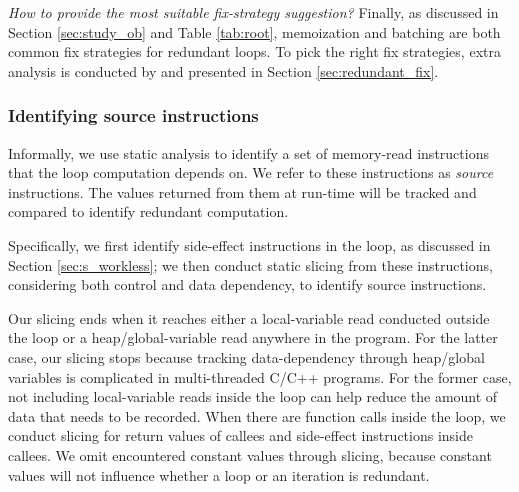 \emph{How to provide the most suitable fix-strategy suggestion?}
Finally, as discussed in Section \ref{sec:study_ob} and Table \ref{tab:root},
memoization and batching are both common fix strategies for redundant loops.
To pick the right fix strategies,
extra analysis is conducted by \Tool and presented in 
Section \ref{sec:redundant_fix}.

\subsubsection{Identifying source instructions}
\label{sec:dependence}

Informally, we use static analysis to identify a set of 
memory-read instructions that the loop computation depends on. We refer
to these instructions as \textit{source} instructions. The values returned
from them at run-time will be tracked and compared to identify
redundant computation.

Specifically, we first identify side-effect instructions in the loop, as 
discussed in Section \ref{sec:s_workless}; we then conduct static slicing 
from these instructions, considering both control and data
dependency, to identify source instructions.

Our slicing ends when it reaches either a local-variable read conducted
outside the loop or a heap/global-variable read anywhere in the program.
For the latter case, our slicing stops because tracking data-dependency
through heap/global variables is complicated in multi-threaded C/C++
programs. For the former case, 
not including local-variable reads inside the loop can help reduce the
amount of data that needs to be recorded. 
When there are function calls inside the loop,  
we conduct slicing for return values of callees and side-effect instructions
inside callees. 
We omit encountered constant values through slicing, because constant values will not influence whether a loop or an iteration is redundant. 



